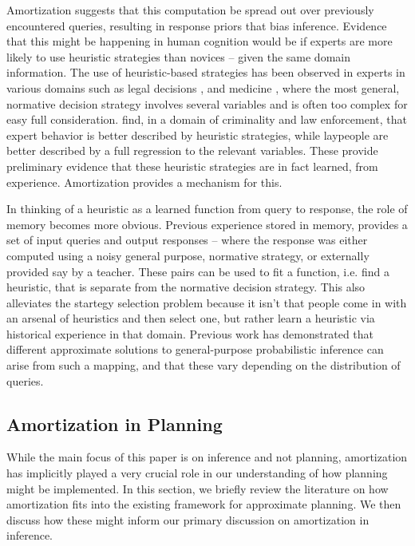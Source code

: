 Amortization suggests that this computation be spread out over previously encountered queries, resulting in response priors that bias inference. Evidence that this might be happening in human cognition would be if experts are more likely to use heuristic strategies than novices -- given the same domain information. The use of heuristic-based strategies has been observed in experts in various domains such as legal decisions \citep{dhami2001bailing}, and medicine \citep{reyna2006physician}, where the most general, normative decision strategy involves several variables and is often too complex for easy full consideration. \cite{garcia2009take} find, in a domain of criminality and law enforcement, that expert behavior is better described by heuristic strategies, while laypeople are better described by a full regression to the relevant variables. These provide preliminary evidence that these heuristic strategies are in fact learned, from experience. Amortization provides a mechanism for this.

In thinking of a heuristic as a learned function from query to response, the role of memory becomes more obvious. Previous experience stored in memory, provides a set of input queries and output responses -- where the response was either computed using a noisy general purpose, normative strategy, or externally provided say by a teacher. These pairs can be used to fit a function, i.e. find a heuristic, that is separate from the normative decision strategy. This also alleviates the startegy selection problem because it isn't that people come in with an arsenal of heuristics and then select one, but rather learn a heuristic via historical experience in that domain. Previous work \citep{gluck1988conditioning, dasgupta2019theory, shanks1991connectionist} has demonstrated that different approximate solutions to general-purpose probabilistic inference can arise from such a mapping, and that these vary depending on the distribution of queries. 


\subsection{Amortization in Planning}

While the main focus of this paper is on inference and not planning, amortization has implicitly played a very crucial role in our understanding of how planning might be implemented. In this section, we briefly review the literature on how amortization fits into the existing framework for approximate planning. We then discuss how these might inform our primary discussion on amortization in inference.

